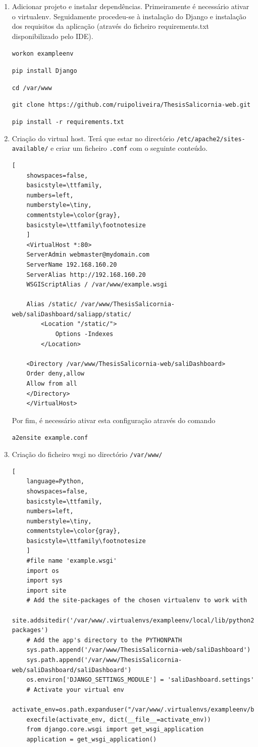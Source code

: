 \begin{enumerate}
	\texttt{mkvirtualenv exampleenv --system-site-packages}
	
	
	\item Adicionar projeto e instalar dependências. Primeiramente é necessário ativar o virtualenv. Seguidamente procedeu-se à instalação do Django e instalação dos requisitos da aplicação (através do ficheiro requirements.txt disponibilizado pelo IDE). 
	
	\texttt{workon exampleenv}
	
	\texttt{pip install Django}
	
	\texttt{cd /var/www}
	
	\texttt{git clone https://github.com/ruipoliveira/ThesisSalicornia-web.git}
	
	\texttt{pip install -r requirements.txt}
	
	

	

	\item Criação do virtual host. Terá que estar no directório \texttt{/etc/apache2/sites-available/} e criar um ficheiro \texttt{.conf} com o seguinte conteúdo. 
	
	\begin{lstlisting}[
	showspaces=false,
	basicstyle=\ttfamily,
	numbers=left,
	numberstyle=\tiny,
	commentstyle=\color{gray},
	basicstyle=\ttfamily\footnotesize
	]
	<VirtualHost *:80>
	ServerAdmin webmaster@mydomain.com
	ServerName 192.168.160.20
	ServerAlias http://192.168.160.20
	WSGIScriptAlias / /var/www/example.wsgi
	
	Alias /static/ /var/www/ThesisSalicornia-web/saliDashboard/saliapp/static/
		<Location "/static/">
			Options -Indexes
		</Location> 
	
	<Directory /var/www/ThesisSalicornia-web/saliDashboard>
	Order deny,allow    
	Allow from all
	</Directory>
	</VirtualHost>
	\end{lstlisting}
	
	Por fim, é necessário ativar esta configuração através do comando
	
	\texttt{a2ensite example.conf}
	
	
	\item Criação do ficheiro wsgi no directório \texttt{/var/www/}
	
	\begin{lstlisting}[
	language=Python,
	showspaces=false,
	basicstyle=\ttfamily,
	numbers=left,
	numberstyle=\tiny,
	commentstyle=\color{gray},
	basicstyle=\ttfamily\footnotesize
	]
	#file name 'example.wsgi'
	import os
	import sys
	import site
	# Add the site-packages of the chosen virtualenv to work with
	site.addsitedir('/var/www/.virtualenvs/exampleenv/local/lib/python2.7/site-packages')
	# Add the app's directory to the PYTHONPATH
	sys.path.append('/var/www/ThesisSalicornia-web/saliDashboard')
	sys.path.append('/var/www/ThesisSalicornia-web/saliDashboard/saliDashboard')
	os.environ['DJANGO_SETTINGS_MODULE'] = 'saliDashboard.settings'
	# Activate your virtual env
	activate_env=os.path.expanduser("/var/www/.virtualenvs/exampleenv/bin/activate_this.py")
	execfile(activate_env, dict(__file__=activate_env))
	from django.core.wsgi import get_wsgi_application
	application = get_wsgi_application()\end{lstlisting}
	

\end{enumerate}
